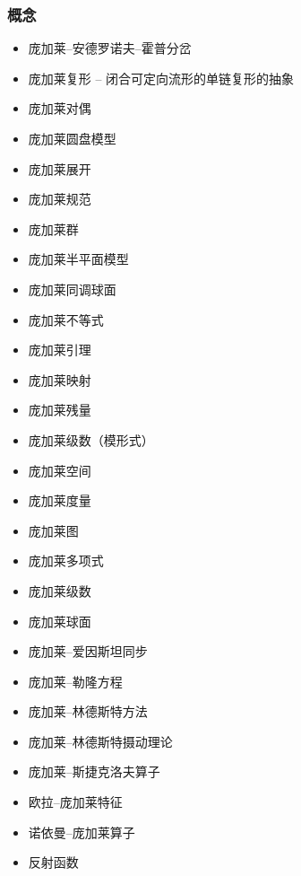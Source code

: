\subsubsection{概念}
\begin{itemize}
\item 庞加莱–安德罗诺夫–霍普分岔  
\item 庞加莱复形 – 闭合可定向流形的单链复形的抽象  
\item 庞加莱对偶  
\item 庞加莱圆盘模型  
\item 庞加莱展开  
\item 庞加莱规范  
\item 庞加莱群  
\item 庞加莱半平面模型  
\item 庞加莱同调球面  
\item 庞加莱不等式  
\item 庞加莱引理  
\item 庞加莱映射  
\item 庞加莱残量  
\item 庞加莱级数（模形式）  
\item 庞加莱空间  
\item 庞加莱度量  
\item 庞加莱图  
\item 庞加莱多项式  
\item 庞加莱级数  
\item 庞加莱球面  
\item 庞加莱–爱因斯坦同步  
\item 庞加莱–勒隆方程  
\item 庞加莱–林德斯特方法  
\item 庞加莱–林德斯特摄动理论  
\item 庞加莱–斯捷克洛夫算子  
\item 欧拉–庞加莱特征  
\item 诺依曼–庞加莱算子  
\item 反射函数  
\end{itemize}